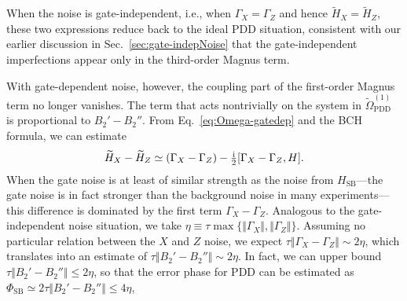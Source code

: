 \documentclass[twocolumn,pra,superscriptaddress]{revtex4-2}
\newcommand{\ep}{\Phi_\mathrm{SB}}
\begin{document}
When the noise is gate-independent, i.e., when $\Gamma_X=\Gamma_Z$ and hence $\widetilde H_X=\widetilde H_Z$, these two expressions reduce back to the ideal PDD situation, consistent with our earlier discussion in Sec.~\ref{sec:gate-indepNoise} that the gate-independent imperfections appear only in the third-order Magnus term.  

%
With gate-dependent noise, however, the coupling part of the first-order Magnus term no longer vanishes. 
The term that acts nontrivially on the system in $\widetilde \Omega_\mathrm{PDD}^{(1)}$ is proportional to $B_2'-B_2''$. From Eq.~\eqref{eq:Omega-gatedep} and the BCH formula, we can estimate 
\begin{equation}
\widetilde H_X-\widetilde H_Z\simeq (\Gamma_X-\Gamma_Z)-\tfrac{\mathrm{i}}{2}[\Gamma_X-\Gamma_Z,H].
\end{equation}
When the gate noise is at least of similar strength as the noise from $H_\mathrm{SB}$---the gate noise is in fact stronger than the background noise in many experiments---this difference is dominated by the first term $\Gamma_X-\Gamma_Z$. Analogous to the gate-independent noise situation, we take $\eta\equiv \tau \max\{\Vert \Gamma_X\Vert,\Vert \Gamma_Z\Vert\}$. Assuming no particular relation between the $X$ and $Z$ noise, we expect $\tau\Vert\Gamma_X-\Gamma_Z\Vert\sim 2\eta$, which translates into an estimate of $\tau\Vert B_2'-B_2''\Vert \sim 2\eta$. In fact, we can upper bound $\tau\Vert B_2'-B_2''\Vert\leq 2\eta$, so that the error phase for PDD can be estimated as $\ep\simeq 2\tau\Vert B_2'-B_2''\Vert\leq 4\eta$, 
\end{document}
